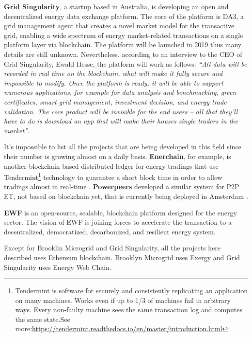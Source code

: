 \textbf{Grid Singularity}, a startup based in Australia, is developing an open and decentralized energy data exchange platform. The core of the platform is DA3,  a grid management agent that creates a novel market model for the transactive grid, enabling a wide spectrum of energy market-related transactions on a single platform layer via blockchain. The platform will be launched in 2019 thus many details are still unknown. Nevertheless, according to an interview to the CEO of Grid Singularity, Ewald Hesse, the platform will work as follows:
\textit{“All data will be recorded in real time on the blockchain, what will make it fully secure and impossible to modify. Once the platform is ready, it will be able to support numerous applications, for example for data analysis and benchmarking, green certificates, smart grid management, investment decision, and energy trade validation. The core product will be invisible for the end users – all that they’ll have to do is download an app that will make their houses single traders in the market”}\cite{gridsingularity}.  	



It’s impossible to list all the projects that are being developed in this field since their number is growing almost on a daily basis. \textbf{Enerchain}, for example, is another blockchain based distributed ledger for energy tradings that use Tendermint\footnote{Tendermint is software for securely and consistently replicating an application on many machines. Works even if up to 1/3 of machines fail in arbitrary ways. Every non-faulty machine sees the same transaction log and computes the same state.See more:\url{https://tendermint.readthedocs.io/en/master/introduction.html}
} technology to guarantee a short block time in order to allow tradings almost in real-time \cite{enerchain}. \textbf{Powerpeers} developed a similar system for P2P \ac{ET}, not based on blockchain yet, that is currently being deployed in Amsterdam \cite{powerpeers}. 



\textbf{\ac{EWF}} is an open-source, scalable, blockchain platform designed for the energy sector. The vision of \ac{EWF} is joining forces to accelerate the transaction to a decentralized, democratized, decarbonized, and resilient energy system. 
	
	
	
Except for Brooklin Microgrid and Grid Singularity, all the projects here described uses Ethereum blockchain. Brooklyn Microgrid uses Exergy and Grid Singularity uses Energy Web Chain.


